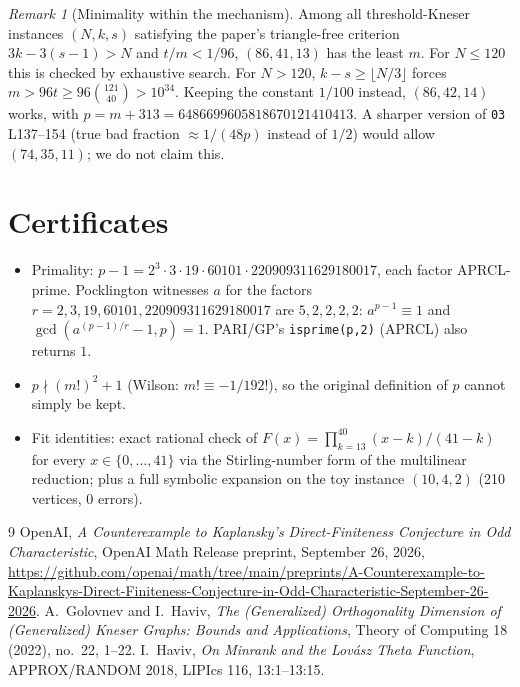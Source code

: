 \documentclass[11pt]{amsart}
\theoremstyle{remark}
\newtheorem{remark}[theorem]{Remark}
\begin{document}
\begin{remark}[Minimality within the mechanism]
Among all threshold-Kneser instances $(N,k,s)$ satisfying the paper's triangle-free criterion
$3k-3(s-1)>N$ and $t/m<1/96$, $(86,41,13)$ has the least $m$. For $N\le120$ this is checked by
exhaustive search. For $N>120$, $k-s\ge\lfloor N/3\rfloor$ forces $m>96t\ge96\binom{121}{40}>10^{34}$.
Keeping the constant $1/100$ instead, $(86,42,14)$ works, with $p=m+313=6486699605818670121410413$.
A sharper version of \texttt{03} L137--154 (true bad fraction $\approx1/(48p)$ instead of
$1/2$) would allow $(74,35,11)$; we do not claim this.
\end{remark}

\section{Certificates}
\begin{itemize}
\item Primality: $p-1=2^3\cdot3\cdot19\cdot60101\cdot220909311629180017$, each factor APRCL-prime.
Pocklington witnesses $a$ for the factors $r=2,3,19,60101,220909311629180017$ are $5,2,2,2,2$:
$a^{p-1}\equiv1$ and $\gcd(a^{(p-1)/r}-1,p)=1$. PARI/GP's \texttt{isprime(p,2)} (APRCL) also returns $1$.
\item $p\nmid(m!)^2+1$ (Wilson: $m!\equiv-1/192!$), so the original definition of $p$ cannot simply be kept.
\item Fit identities: exact rational check of $F(x)=\prod_{k=13}^{40}(x-k)/(41-k)$ for every
$x\in\{0,\dots,41\}$ via the Stirling-number form of the multilinear reduction; plus a full
symbolic expansion on the toy instance $(10,4,2)$ (210 vertices, $0$ errors).
\end{itemize}

\begin{thebibliography}{9}
 OpenAI, \emph{A Counterexample to Kaplansky's Direct-Finiteness Conjecture in Odd
Characteristic}, OpenAI Math Release preprint, September 26, 2026,
\url{https://github.com/openai/math/tree/main/preprints/A-Counterexample-to-Kaplanskys-Direct-Finiteness-Conjecture-in-Odd-Characteristic-September-26-2026}.
 A.~Golovnev and I.~Haviv, \emph{The (Generalized) Orthogonality Dimension of (Generalized) Kneser Graphs: Bounds and Applications}, Theory of Computing 18 (2022), no.~22, 1--22.
 I.~Haviv, \emph{On Minrank and the Lov\'asz Theta Function}, APPROX/RANDOM 2018, LIPIcs 116, 13:1--13:15.
\end{thebibliography}
\end{document}
